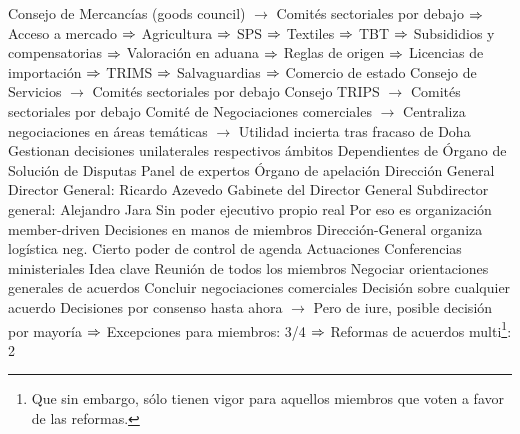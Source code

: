 \documentclass{nuevotema}
\begin{document}
\begin{esquemal}
				\4[] Consejo de Mercancías (goods council)
				\4[] $\to$ Comités sectoriales por debajo
				\4[] $\then$ Acceso a mercado
				\4[] $\then$ Agricultura
				\4[] $\then$ SPS
				\4[] $\then$ Textiles
				\4[] $\then$ TBT
				\4[] $\then$ Subsididios y compensatorias
				\4[] $\then$ Valoración en aduana
				\4[] $\then$ Reglas de origen
				\4[] $\then$ Licencias de importación
				\4[] $\then$ TRIMS
				\4[] $\then$ Salvaguardias
				\4[] $\then$ Comercio de estado
				\4[] Consejo de Servicios
				\4[] $\to$ Comités sectoriales por debajo
				\4[] Consejo TRIPS
				\4[] $\to$ Comités sectoriales por debajo
				\4[] Comité de Negociaciones comerciales
				\4[] $\to$ Centraliza negociaciones en áreas temáticas
				\4[] $\to$ Utilidad incierta tras fracaso de Doha
				\4[$\then$] Gestionan decisiones unilaterales respectivos ámbitos
				\4 Dependientes de Órgano de Solución de Disputas
				\4[] Panel de expertos
				\4[] Órgano de apelación
			\3[] Dirección General
				\4 Director General: Ricardo Azevedo
				\4 Gabinete del Director General
				\4 Subdirector general: Alejandro Jara
				\4 Sin poder ejecutivo propio real
				\4[] Por eso es organización member-driven
				\4 Decisiones en manos de miembros
				\4[] Dirección-General organiza logística neg.
				\4[] Cierto poder de control de agenda
		\2 Actuaciones
			\3 Conferencias ministeriales
				\4 Idea clave
				\4[] Reunión de todos los miembros
				\4[] Negociar orientaciones generales de acuerdos
				\4[] Concluir negociaciones comerciales
				\4[] Decisión sobre cualquier acuerdo
				\4[] Decisiones por consenso hasta ahora
				\4[] $\to$ Pero de iure, posible decisión por mayoría
				\4[] $\then$ Excepciones para miembros: 3/4
				\4[] $\then$ Reformas de acuerdos multi\footnote{Que sin embargo, sólo tienen vigor para aquellos miembros que voten a favor de las reformas.}: 2\3


\end{esquemal}
\end{document}
